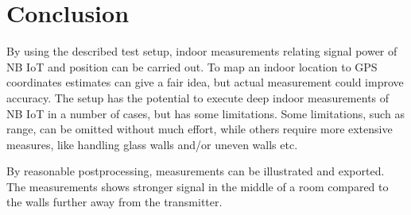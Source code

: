 \documentclass[a4paper,twoside, 12pt]{article}
\begin{document}
\section{Conclusion}
By using the described test setup, indoor measurements relating signal power of NB IoT and position can be carried out. To map an indoor location to GPS coordinates estimates can give a fair idea, but actual measurement could improve accuracy. The setup has the potential to execute deep indoor measurements of NB IoT in a number of cases, but has some limitations. Some limitations, such as range, can be omitted without much effort, while others require more extensive measures, like handling glass walls and/or uneven walls etc.

By reasonable postprocessing, measurements can be illustrated and exported. The measurements shows stronger signal in the middle of a room compared to the walls further away from the transmitter.



\clearpage
\newpage


\end{document}
